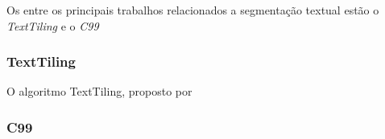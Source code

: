 Os entre os principais trabalhos relacionados a segmentação textual estão o \textit{TextTiling} e o \textit{C99}



\subsubsection{TextTiling}
	O algoritmo TextTiling, proposto por \cite{fulano} 

\subsubsection{C99}



